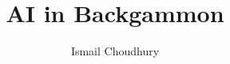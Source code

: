 \documentclass[12pt]{third-rep}
\title{AI in Backgammon}
\author{Ismail Choudhury}
\theoremstyle{definition}
\begin{document}
\dotitleandabstract

\tableofcontents






% 


 
\end{document}

